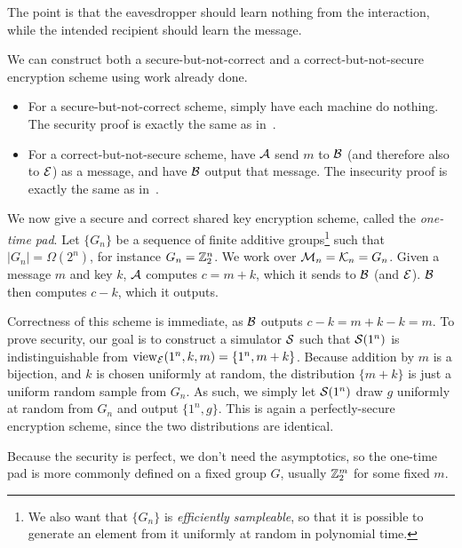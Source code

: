 The point is that the eavesdropper should learn nothing from the interaction,
while the intended recipient should learn the message.

\begin{ex}
  We can construct both a secure-but-not-correct and a correct-but-not-secure
  encryption scheme using work already done.
  \begin{itemize}
    \item For a secure-but-not-correct scheme, simply have each machine do
      nothing. The security proof is exactly the same as
      in~.
    \item For a correct-but-not-secure scheme, have $\mathcal{A}$ send $m$ to $\mathcal{B}$ (and
      therefore also to $\mathcal{E}$) as a message, and have $\mathcal{B}$ output that message. The
      insecurity proof is exactly the same as in~.
  \end{itemize}
\end{ex}

\begin{ex}\label{ex:otp}
We now give a secure and correct shared key encryption scheme, called the
\emph{one-time pad}. Let $\{G_n\}$ be a sequence of finite additive groups\footnote{
  We also want that $\{G_n\}$ is \emph{efficiently sampleable}, so that it is
  possible to generate an element from it uniformly at random in polynomial
  time.
} such that $|G_n| = \Omega(2^n)$, for instance $G_n = \mathbb{Z}_2^n$. We work over
$\mathcal{M}_n = \mathcal{K}_n = G_n$. Given a message $m$ and key $k$, $\mathcal{A}$ computes $c = m +
k$, which it sends to $\mathcal{B}$ (and $\mathcal{E}$). $\mathcal{B}$ then computes $c - k$, which it
outputs.

Correctness of this scheme is immediate, as $\mathcal{B}$ outputs $c - k = m + k - k =
m$. To prove security, our goal is to construct a simulator $\mathcal{S}$ such that
$\mathcal{S}(1^n)$ is indistinguishable from $\operatorname{view}_{\mathcal{E}}(1^n, k, m) = \{1^n, m + k\}$. Because
addition by $m$ is a bijection, and $k$ is chosen uniformly at random, the
distribution $\{m + k\}$ is just a uniform random sample from $G_n$. As such, we
simply let $\mathcal{S}(1^n)$ draw $g$ uniformly at random from $G_n$ and output $\{1^n,
g\}$. This is again a perfectly-secure encryption scheme, since the two
distributions are identical.

Because the security is perfect, we don't need the asymptotics, so the one-time
pad is more commonly defined on a fixed group $G$, usually $\mathbb{Z}_2^m$ for some
fixed $m$.
\end{ex}

